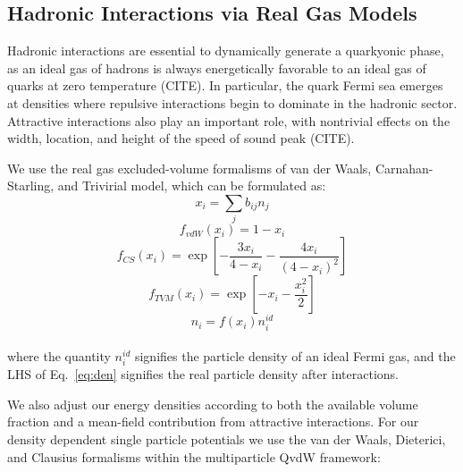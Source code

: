 \documentclass[twocolumn,floatfix,superscriptaddress,a4paper,showkeys,nofootinbib,reprint]{revtex4-1}
\begin{document}
\subsection{Hadronic Interactions via Real Gas Models}
\label{subsec:realgas}

Hadronic interactions are essential to dynamically generate a quarkyonic phase, as an ideal gas of hadrons is always energetically favorable to an ideal gas of quarks at zero temperature (CITE). In particular, the quark Fermi sea emerges at densities where repulsive interactions begin to dominate in the hadronic sector. Attractive interactions also play an important role, with nontrivial effects on the width, location, and height of the speed of sound peak (CITE).

We use the real gas excluded-volume formalisms of van der Waals, Carnahan-Starling, and Trivirial model, which can be formulated as: 
\begin{equation}
\label{eq:prot_nuc}
    x_i = \sum_j b_{ij}n_j
\end{equation}
\begin{equation}
\label{eq:EV_VDW}
    f_{vdW}(x_i) = 1 - x_i
\end{equation}
\begin{equation}
\label{eq:EV_CS}
    f_{CS}(x_i) = \exp\left[-\frac{3 x_i}{4 - x_i}-\frac{4 x_i}{(4 - x_i)^2}\right]
\end{equation}
\begin{equation}
\label{eq:EV_TVM}
    f_{TVM}(x_i) =  \exp\left[-x_i-\frac{x_i^2}{2}\right]
\end{equation}
\begin{equation}
    n_i = f(x_i)n_i^{id}
\label{eq:den}
\end{equation}
\\
where the quantity $n_i^{id}$ signifies the particle density of an ideal Fermi gas, and the LHS of Eq.~\ref{eq:den} signifies the real particle density after interactions.

We also adjust our energy densities according to both the available volume fraction and a mean-field contribution from attractive interactions. For our density dependent single particle potentials we use the van der Waals, Dieterici, and Clausius formalisms within the multiparticle QvdW framework:
\end{document}
